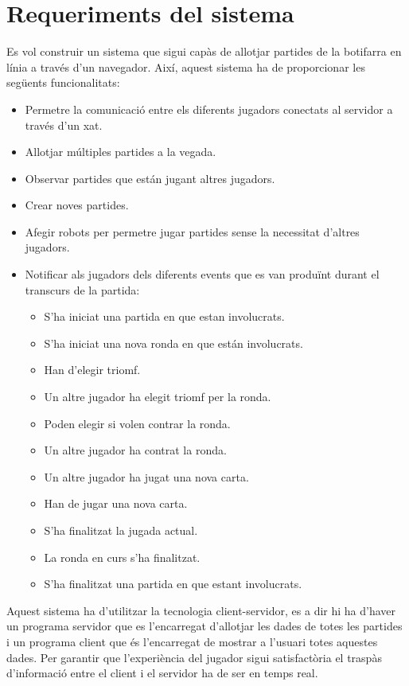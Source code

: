 

\chapter{Requeriments del sistema}
\label{chap:requeriments}

Es vol construir un sistema que sigui capàs de allotjar partides de la botifarra en línia a través d'un navegador. Així, aquest sistema ha de proporcionar les següents funcionalitats: 

\begin{itemize}
\item{Permetre la comunicació entre els diferents jugadors conectats al servidor a través d'un xat.}
\item{Allotjar múltiples partides a la vegada.}
\item{Observar partides que están jugant altres jugadors.}
\item{Crear noves partides.}
\item{Afegir robots per permetre jugar partides sense la necessitat d'altres jugadors.}
\item{
    Notificar als jugadors dels diferents events que es van produïnt durant el transcurs de la partida:
    \begin{itemize}
        \item{S'ha iniciat una partida en que estan involucrats.}
        \item{S'ha iniciat una nova ronda en que están involucrats.}
        \item{Han d'elegir triomf.}
        \item{Un altre jugador ha elegit triomf per la ronda.}
        \item{Poden elegir si volen contrar la ronda.}
        \item{Un altre jugador ha contrat la ronda.}
        \item{Un altre jugador ha jugat una nova carta.}
        \item{Han de jugar una nova carta.}
        \item{S'ha finalitzat la jugada actual.}
        \item{La ronda en curs s'ha finalitzat.}
        \item{S'ha finalitzat una partida en que estant involucrats.}
    \end{itemize}
}
\end{itemize}

Aquest sistema ha d'utilitzar la tecnologia client-servidor, es a dir hi ha d'haver un programa servidor que es l'encarregat d'allotjar les dades de totes les partides i un programa client que és l'encarregat de mostrar a l'usuari totes aquestes dades. Per garantir que l'experiència del jugador sigui satisfactòria el traspàs d'informació entre el client i el servidor ha de ser en temps real. 

